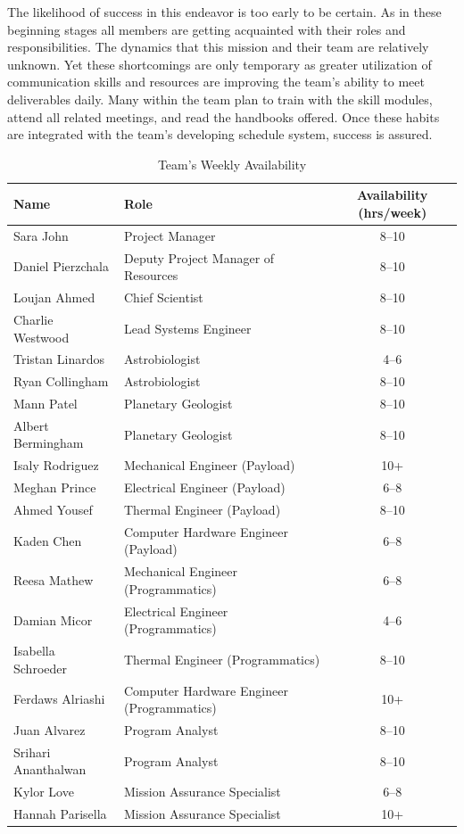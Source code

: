 The likelihood of success in this endeavor is too early to be certain. As in these beginning stages all members are getting acquainted with their roles and responsibilities. The dynamics that this mission and their team are relatively unknown. Yet these shortcomings are only temporary as greater utilization of communication skills and resources are improving the team’s ability to meet deliverables daily. Many within the team plan to train with the skill modules, attend all related meetings, and read the handbooks offered. Once these habits are integrated with the team’s developing schedule system, success is assured.

\begin{table}[H]
\centering
\caption{Team’s Weekly Availability}
\label{tab:availability}
\begin{tabular}{|>{\raggedright}p{4cm}|>{\raggedright}p{6cm}|c|}
\hline
\textbf{Name} & \textbf{Role} & \textbf{Availability (hrs/week)} \\
\hline
Sara John & Project Manager & 8--10 \\
Daniel Pierzchala & Deputy Project Manager of Resources & 8--10 \\
Loujan Ahmed & Chief Scientist & 8--10 \\
Charlie Westwood & Lead Systems Engineer & 8--10 \\
Tristan Linardos & Astrobiologist & 4--6 \\
Ryan Collingham & Astrobiologist & 8--10 \\
Mann Patel & Planetary Geologist & 8--10 \\
Albert Bermingham & Planetary Geologist & 8--10 \\
Isaly Rodriguez & Mechanical Engineer (Payload) & 10+ \\
Meghan Prince & Electrical Engineer (Payload) & 6--8 \\
Ahmed Yousef & Thermal Engineer (Payload) & 8--10 \\
Kaden Chen & Computer Hardware Engineer (Payload) & 6--8 \\
Reesa Mathew & Mechanical Engineer (Programmatics) & 6--8 \\
Damian Micor & Electrical Engineer (Programmatics) & 4--6 \\
Isabella Schroeder & Thermal Engineer (Programmatics) & 8--10 \\
Ferdaws Alriashi & Computer Hardware Engineer (Programmatics) & 10+ \\
Juan Alvarez & Program Analyst & 8--10 \\
Srihari Ananthalwan & Program Analyst & 8--10 \\
Kylor Love & Mission Assurance Specialist & 6--8 \\
Hannah Parisella & Mission Assurance Specialist & 10+ \\
\hline
\end{tabular}
\end{table}